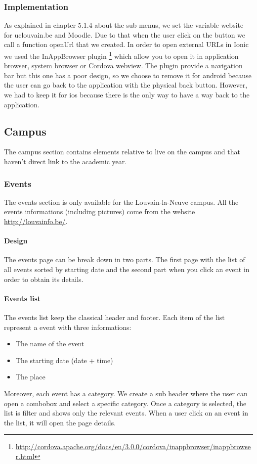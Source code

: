 \documentclass{eplmastersthesis}
\begin{document}
\subsubsection{Implementation}
As explained in chapter 5.1.4 about the sub menus, we set the variable website for uclouvain.be and Moodle. Due to that when the user click on the button we call a function openUrl that we created. In order to open external URLs in Ionic we used the InAppBrowser plugin \footnote{\url{http://cordova.apache.org/docs/en/3.0.0/cordova/inappbrowser/inappbrowser.html}} which allow you to open it in application browser, system browser or Cordova webview. The plugin provide a navigation bar but this one has a poor design, so we choose to remove it for android because the user can go back to the application with the physical back button. However, we had to keep it for ios because there is the only way to have a way back to the application. 

\subsection{Campus}
The campus section contains elements relative to live on the campus and that haven't direct link to the academic year. 

\subsubsection{Events}
The events section is only available for the Louvain-la-Neuve campus. All the events informations (including pictures) come from the website \url{http://louvainfo.be/}.
\paragraph{Design}
The events page can be break down in two parts. The first page with the list of all events sorted by starting date and the second part when you click an event in order to obtain its details. 
\paragraph{Events list}
The events list keep the classical header and footer. Each item of the list represent a event with three informations:
\begin{itemize}
\item The name of the event
\item The starting date (date + time)
\item The place
\end{itemize}
Moreover, each event has a category. We create a sub header where the user can open a combobox and select a specific category. Once a category is selected, the list is filter and shows only the relevant events. When a user click on an event in the list, it will open the page details.
\end{document}
